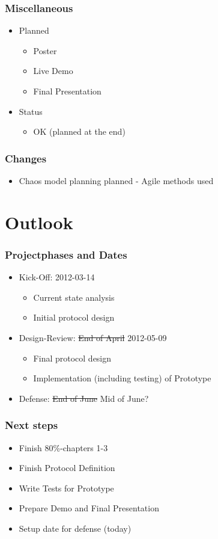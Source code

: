 \documentclass{beamer}
\begin{document}
\frame
{
  \frametitle{Miscellaneous}
  \begin{itemize}
      \item Planned
      \begin{itemize}
          \item Poster
          \item Live Demo
          \item Final Presentation
      \end{itemize}
      \item Status
      \begin{itemize}
          \item OK (planned at the end)
      \end{itemize}
  \end{itemize}
}

\frame
{
  \frametitle{Changes}
  \begin{itemize}
    \item Chaos model planning planned - \alert{Agile methods used}
  \end{itemize}
}

\section{Outlook}
\frame
{
  \frametitle{Projectphases and Dates}
  \begin{itemize}
     \item Kick-Off: 2012-03-14
      \begin{itemize}
         \item Current state analysis
         \item Initial protocol design
      \end{itemize}
     \item Design-Review: \sout{End of April} \alert{2012-05-09}
     \begin{itemize}
         \item Final protocol design
         \item Implementation (including testing) of Prototype
     \end{itemize}
     \item Defense: \sout{End of June} \alert{Mid of June?}
  \end{itemize}
}

\frame
{
  \frametitle{Next steps}
  \begin{itemize}
    \item Finish 80\%-chapters 1-3
    \item Finish Protocol Definition
    \item Write Tests for Prototype
    \item Prepare Demo and Final Presentation
    \item Setup date for defense (today)
  \end{itemize}
}
\end{document}
